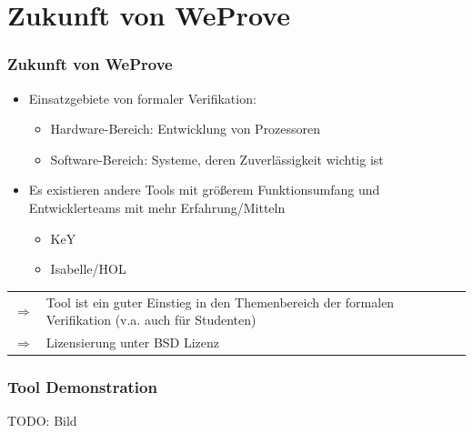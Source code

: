 \documentclass{beamer}
\newcommand{\WProve}{W\tiny{}e\Large{}Prove}
\begin{document}
\section{Zukunft von \WProve}
\begin{frame}
\frametitle{Zukunft von \WProve}
\begin{itemize}
\item Einsatzgebiete von formaler Verifikation:
\begin{itemize}
\item Hardware-Bereich: Entwicklung von Prozessoren
\item Software-Bereich: Systeme, deren Zuverlässigkeit wichtig ist
\end{itemize}
\item Es existieren andere Tools mit größerem Funktionsumfang und
Entwicklerteams mit mehr Erfahrung/Mitteln
\begin{itemize}
\item KeY
\item Isabelle/HOL
\end{itemize}
\end{itemize}
\begin{tabular}{p{1mm}p{10.9cm}}
$\Rightarrow$ & Tool ist ein guter Einstieg in den Themenbereich der formalen
Verifikation (v.a. auch für Studenten)\\
$\Rightarrow$ & Lizensierung unter BSD Lizenz
\end{tabular}
\end{frame}

\begin{frame}
\frametitle{Tool Demonstration}
TODO: Bild
\end{frame}
\end{document}
